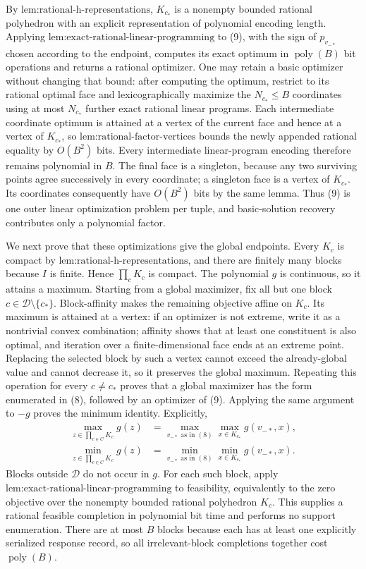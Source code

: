 By \(\text{lem:rational-h-representations}\), \(K_{c_*}\) is a nonempty bounded rational polyhedron with an explicit representation of polynomial encoding length.  Applying \(\text{lem:exact-rational-linear-programming}\) to (9), with the sign of \(p_{v_{-*}}\) chosen according to the endpoint, computes its exact optimum in \(\operatorname{poly}(B)\) bit operations and returns a rational optimizer.  One may retain a basic optimizer without changing that bound: after computing the optimum, restrict to its rational optimal face and lexicographically maximize the \(N_{c_*}\le B\) coordinates using at most \(N_{c_*}\) further exact rational linear programs.  Each intermediate coordinate optimum is attained at a vertex of the current face and hence at a vertex of \(K_{c_*}\), so \(\text{lem:rational-factor-vertices}\) bounds the newly appended rational equality by \(O(B^2)\) bits.  Every intermediate linear-program encoding therefore remains polynomial in \(B\).  The final face is a singleton, because any two surviving points agree successively in every coordinate; a singleton face is a vertex of \(K_{c_*}\).  Its coordinates consequently have \(O(B^2)\) bits by the same lemma.  Thus (9) is one outer linear optimization problem per tuple, and basic-solution recovery contributes only a polynomial factor.

We next prove that these optimizations give the global endpoints.  Every \(K_c\) is compact by \(\text{lem:rational-h-representations}\), and there are finitely many blocks because \(I\) is finite.  Hence \(\prod_cK_c\) is compact.  The polynomial \(g\) is continuous, so it attains a maximum.  Starting from a global maximizer, fix all but one block \(c\in\mathcal D\setminus\{c_*\}\).  Block-affinity makes the remaining objective affine on \(K_c\).  Its maximum is attained at a vertex: if an optimizer is not extreme, write it as a nontrivial convex combination; affinity shows that at least one constituent is also optimal, and iteration over a finite-dimensional face ends at an extreme point.  Replacing the selected block by such a vertex cannot exceed the already-global value and cannot decrease it, so it preserves the global maximum.  Repeating this operation for every \(c\ne c_*\) proves that a global maximizer has the form enumerated in (8), followed by an optimizer of (9).  Applying the same argument to \(-g\) proves the minimum identity.  Explicitly,
\[
 \begin{aligned}
 \max_{z\in\prod_{c\in C}K_c}g(z)
 &=\max_{v_{-*}\text{ as in }(8)}
   \max_{x\in K_{c_*}}g(v_{-*},x),\\
 \min_{z\in\prod_{c\in C}K_c}g(z)
 &=\min_{v_{-*}\text{ as in }(8)}
   \min_{x\in K_{c_*}}g(v_{-*},x).
 \end{aligned}
 \tag{10}
\]
Blocks outside \(\mathcal D\) do not occur in \(g\).  For each such block, apply \(\text{lem:exact-rational-linear-programming}\) to feasibility, equivalently to the zero objective over the nonempty bounded rational polyhedron \(K_c\).  This supplies a rational feasible completion in polynomial bit time and performs no support enumeration.  There are at most \(B\) blocks because each has at least one explicitly serialized response record, so all irrelevant-block completions together cost \(\operatorname{poly}(B)\).

